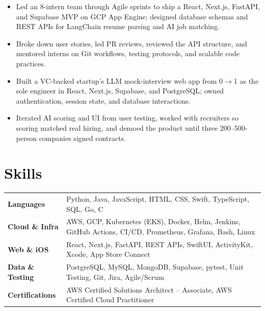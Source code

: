 \documentclass[11pt, letterpaper]{article}
\begin{document}
\begin{itemize}
  \item Led an 8-intern team through Agile sprints to ship a React, Next.js, FastAPI, and Supabase MVP on GCP App Engine; designed database schemas and REST APIs for LangChain resume parsing and AI job matching.
  \item Broke down user stories, led PR reviews, reviewed the API structure, and mentored interns on Git workflows, testing protocols, and scalable code practices.
\end{itemize}

\begin{itemize}
  \item Built a VC-backed startup's LLM mock-interview web app from 0$\to$1 as the sole engineer in React, Next.js, Supabase, and PostgreSQL; owned authentication, session state, and database interactions.
  \item Iterated AI scoring and UI from user testing, worked with recruiters so scoring matched real hiring, and demoed the product until three 200--500-person companies signed contracts.
\end{itemize}

\section{Skills}
\begin{tabularx}{\textwidth}{@{}l @{\hspace{7pt}} >{\raggedright\arraybackslash}X@{}}
  \textbf{Languages} & Python, Java, JavaScript, HTML, CSS, Swift, TypeScript, SQL, Go, C \\[1pt]
  \textbf{Cloud \& Infra} & AWS, GCP, Kubernetes (EKS), Docker, Helm, Jenkins, GitHub Actions, CI/CD, Prometheus, Grafana, Bash, Linux \\[1pt]
  \textbf{Web \& iOS} & React, Next.js, FastAPI, REST APIs, SwiftUI, ActivityKit, Xcode, App Store Connect \\[1pt]
  \textbf{Data \& Testing} & PostgreSQL, MySQL, MongoDB, Supabase, pytest, Unit Testing, Git, Jira, Agile/Scrum \\[1pt]
  \textbf{Certifications} & AWS Certified Solutions Architect -- Associate, AWS Certified Cloud Practitioner \\
\end{tabularx}
\end{document}
